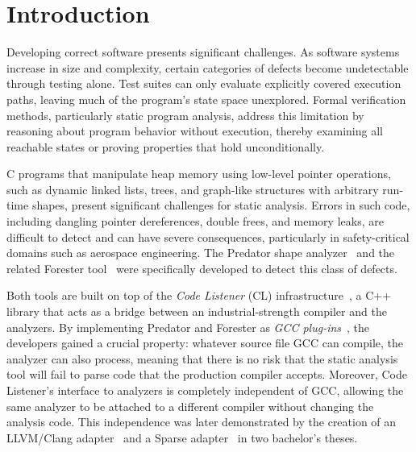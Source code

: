 \chapter{Introduction}
\label{chap:introduction}

Developing correct software presents significant challenges. As software systems increase in size and complexity, certain categories of defects become undetectable through testing alone. Test suites can only evaluate explicitly covered execution paths, leaving much of the program's state space unexplored. Formal verification methods, particularly static program analysis, address this limitation by reasoning about program behavior without execution, thereby examining all reachable states or proving properties that hold unconditionally.

C programs that manipulate heap memory using low-level pointer operations, such as dynamic linked lists, trees, and graph-like structures with arbitrary run-time shapes, present significant challenges for static analysis. Errors in such code, including dangling pointer dereferences, double frees, and memory leaks, are difficult to detect and can have severe consequences, particularly in safety-critical domains such as aerospace engineering. The Predator shape analyzer~\cite{PredatorSuite2016} and the related Forester tool~\cite{CodeListener2012} were specifically developed to detect this class of defects.

Both tools are built on top of the \emph{Code Listener} (CL) infrastructure~\cite{CodeListener2012}, a C++ library that acts as a bridge between an industrial-strength compiler and the analyzers. By implementing Predator and Forester as \emph{GCC plug-ins}~\cite{GCCPluginAPI}, the developers gained a crucial property: whatever source file GCC can compile, the analyzer can also process, meaning that there is no risk that the static analysis tool will fail to parse code that the production compiler accepts. Moreover, Code Listener's interface to analyzers is completely independent of GCC, allowing the same analyzer to be attached to a different compiler without changing the analysis code. This independence was later demonstrated by the creation of an LLVM/Clang adapter~\cite{LLVMAdapter2014} and a Sparse adapter~\cite{SparseAdapter2012} in two bachelor's theses.


